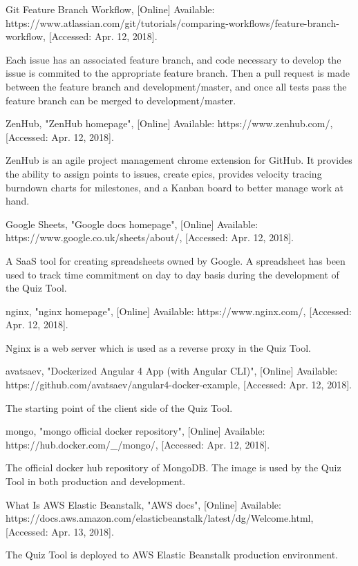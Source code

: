 \documentclass[11pt,a4paper]{report}
\begin{document}
\begin{thebibliography}{1}
 Git Feature Branch Workflow, [Online] Available: https://www.atlassian.com/git/tutorials/comparing-workflows/feature-branch-workflow,
  [Accessed: Apr. 12, 2018].

    Each issue has an associated feature branch, and code necessary to develop the issue is commited to the appropriate feature branch.
    Then a pull request is made between the feature branch and development/master, and once all tests pass the feature branch can
    be merged to development/master.

 ZenHub, "ZenHub homepage", [Online] Available: https://www.zenhub.com/, [Accessed: Apr. 12, 2018].

    ZenHub is an agile project management chrome extension for GitHub. It provides the ability to assign points
    to issues, create epics, provides velocity tracing burndown charts for milestones, and a Kanban board to
    better manage work at hand.

 Google Sheets, "Google docs homepage", [Online] Available: https://www.google.co.uk/sheets/about/, [Accessed: Apr. 12, 2018].

  A SaaS tool for creating spreadsheets owned by Google. A spreadsheet has been used to track time commitment on day to day basis during
  the development of the Quiz Tool.

 nginx, "nginx homepage", [Online] Available: https://www.nginx.com/, [Accessed: Apr. 12, 2018].

  Nginx is a web server which is used as a reverse proxy in the Quiz Tool.

 avatsaev, "Dockerized Angular 4 App (with Angular CLI)", [Online] Available: https://github.com/avatsaev/angular4-docker-example, [Accessed: Apr. 12, 2018].

    The starting point of the client side of the Quiz Tool.

 mongo, "mongo official docker repository", [Online] Available: https://hub.docker.com/\_/mongo/, [Accessed: Apr. 12, 2018].

    The official docker hub repository of MongoDB. The image is used by the Quiz Tool in both production and development.

 What Is AWS Elastic Beanstalk, "AWS docs", [Online] Available: https://docs.aws.amazon.com/elasticbeanstalk/latest/dg/Welcome.html, [Accessed: Apr. 13, 2018].

    The Quiz Tool is deployed to AWS Elastic Beanstalk production environment.


\end{thebibliography}
\end{document}
